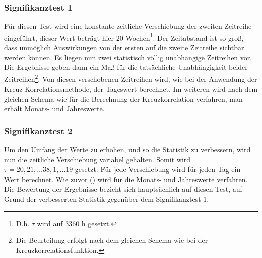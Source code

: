 \documentclass[fontsize=11pt, twoside, a4paper]{scrartcl}
\begin{document}
\subsubsection{Signifikanztest 1}\label{sec:St1}
Für diesen Test wird eine konstante zeitliche Verschiebung der zweiten Zeitreihe eingeführt, dieser Wert beträgt hier 20 Wochen\footnote{D.h. $\tau$ wird auf 3360 h gesetzt.}. Der Zeitabstand ist so groß, dass unmöglich Auswirkungen von der ersten auf die zweite Zeitreihe sichtbar werden können. Es liegen nun zwei statistisch völlig unabhängige Zeitreihen vor. Die Ergebnisse geben dann ein Maß für die tatsächliche Unabhängigkeit beider Zeitreihen\footnote{Die Beurteilung erfolgt nach dem gleichen Schema wie bei der Kreuzkorrelationsfunktion.}. Von diesen verschobenen Zeitreihen wird, wie bei der Anwendung der Kreuz-Korrelationsmethode, der Tageswert berechnet. Im weiteren wird nach dem gleichen Schema wie für die Berechnung der Kreuzkorrelation verfahren, man erhält Monats- und Jahreswerte. 
\subsubsection{Signifikanztest 2}
Um den Umfang der Werte zu erhöhen, und so die Statistik zu verbessern, wird nun die zeitliche Verschiebung variabel gehalten. Somit wird $\tau = 20,21, \ldots 38,1, \ldots 19$ gesetzt. Für jede Verschiebung wird für jeden Tag ein Wert berechnet. Wie zuvor () wird für die Monats- und Jahreswerte verfahren.\\
Die Bewertung der Ergebnisse bezieht sich hauptsächlich auf diesen Test, auf Grund der verbesserten Statistik gegenüber dem Signifikanztest 1.
\end{document}
